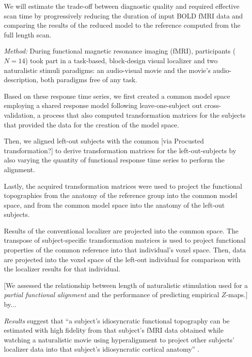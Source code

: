 %
We will estimate the trade-off between diagnostic quality and required effective
scan time by progressively reducing the duration of input BOLD fMRI data and
comparing the results of the reduced model to the reference computed from the
full length scan.


\textit{Method:}
During functional magnetic resonance imaging (fMRI), participants ($N=14$) took
part in a task-based, block-design visual localizer and two naturalistic stimuli
paradigms: an audio-visual movie and the movie's audio-description, both
paradigms free of any task.

Based on these response time series, we first created a common model space
employing a shared response model \citep{chen2015reduced} following
leave-one-subject out cross-validation, a process that also computed
transformation matrices for the subjects that provided the data for the creation
of the model space.

Then, we aligned left-out subjects with the common [via Procusted
transformation?] to derive transformation matrices for the left-out-subjects by
also varying the quantity of functional response time series to perform the
alignment.

Lastly, the acquired transformation matrices were used to project the functional
topographies from the anatomy of the reference group into the common model
space, and from the common model space into the anatomy of the left-out
subjects.

%
Results of the conventional localizer are projected into the common space.
%
The transpose of subject-specific transformation matrices is used to project
functional properties of the common reference into that individual's voxel
space.
%
Then, data are projected into the voxel space of the left-out individual for
comparison with the localizer results for that individual.


[We assessed the relationship between length of naturalistic stimulation used
for a \textit{partial functional alignment} and the performance of predicting
empirical $Z$-maps.] by...

%
\textit{Results} suggest that ``a subject's idiosyncratic functional topography
can be estimated with high fidelity from that subject's fMRI data obtained while
watching a naturalistic movie using hyperalignment to project other subjects’
localizer data into that subject's idiosyncratic cortical anatomy''
\citep{jiahui2020predicting}.

